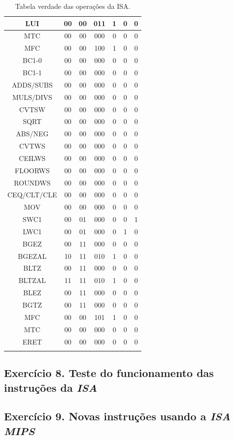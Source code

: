 \documentclass[12pt]{article}
\begin{document}
\begin{longtable}{|c|c|c|c|c|c|c|}
		LUI & 00 & 00 & 011 & 1 & 0 & 0\\\hline	
		MTC & 00 & 00 & 000 & 0 & 0 & 0\\\hline
		MFC & 00 & 00 & 100 & 1 & 0 & 0\\\hline
		BC1-0 & 00 & 00 & 000 & 0 & 0 & 0\\\hline	
		BC1-1 & 00 & 00 & 000 & 0 & 0 & 0\\\hline
		ADDS/SUBS & 00 & 00 & 000 & 0 & 0 & 0\\\hline
		MULS/DIVS & 00 & 00 & 000 & 0 & 0 & 0\\\hline
		CVTSW & 00 & 00 & 000 & 0 & 0 & 0\\\hline	
		SQRT & 00 & 00 & 000 & 0 & 0 & 0\\\hline
		ABS/NEG & 00 & 00 & 000 & 0 & 0 & 0\\\hline
		CVTWS & 00 & 00 & 000 & 0 & 0 & 0\\\hline
		CEILWS & 00 & 00 & 000 & 0 & 0 & 0\\\hline
		FLOORWS & 00 & 00 & 000 & 0 & 0 & 0\\\hline
		ROUNDWS & 00 & 00 & 000 & 0 & 0 & 0\\\hline	
		CEQ/CLT/CLE & 00 & 00 & 000 & 0 & 0 & 0\\\hline
		MOV & 00 & 00 & 000 & 0 & 0 & 0\\\hline
		SWC1 & 00 & 01 & 000 & 0 & 0 & 1\\\hline	
		LWC1 & 00 & 01 & 000 & 0 & 1 & 0\\\hline
		BGEZ & 00 & 11 & 000 & 0 & 0 & 0\\\hline	
		BGEZAL & 10 & 11 & 010 & 1 & 0 & 0\\\hline
		BLTZ & 00 & 11 & 000 & 0 & 0 & 0\\\hline
		BLTZAL & 11 & 11 & 010 & 1 & 0 & 0\\\hline
		BLEZ & 00 & 11 & 000 & 0 & 0 & 0\\\hline
		BGTZ & 00 & 11 & 000 & 0 & 0 & 0\\\hline
		MFC & 00 & 00 & 101 & 1 & 0 & 0\\\hline	
		MTC & 00 & 00 & 000 & 0 & 0 & 0\\\hline
		ERET & 00 & 00 & 000 & 0 & 0 & 0\\\hline			
	\caption{Tabela verdade das operações da ISA.}
	\label{tab:req23}
\end{longtable}









\subsection{Exercício 8. Teste do funcionamento das instruções da \textit{ISA}}
\label{subsec:testeisa}
 
\subsection{Exercício 9. Novas instruções usando a \textit{ISA MIPS}}
\label{subsec:newint}



\end{document}
